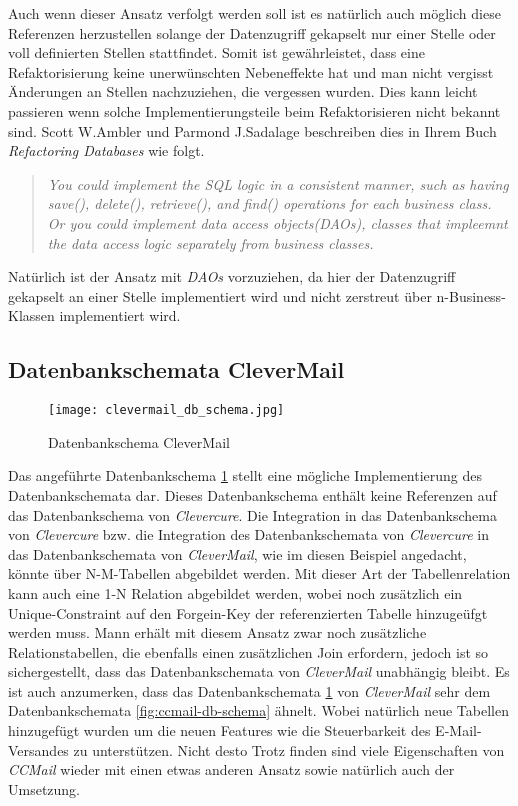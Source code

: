 \newline
\newline
Auch wenn dieser Ansatz verfolgt werden soll ist es natürlich auch möglich diese Referenzen herzustellen solange der Datenzugriff gekapselt nur einer Stelle oder voll definierten Stellen stattfindet. Somit ist gewährleistet, dass eine Refaktorisierung keine unerwünschten Nebeneffekte hat und man nicht vergisst Änderungen an Stellen nachzuziehen, die vergessen wurden. Dies kann leicht passieren wenn solche Implementierungsteile beim Refaktorisieren nicht bekannt sind. Scott W.Ambler und Parmond J.Sadalage beschreiben dies in Ihrem Buch 
\emph{Refactoring Databases} \cite[66]{refactoreDatabase} wie folgt.
\begin{quote}
\emph{You could implement the SQL logic in a consistent manner, such as having save(), delete(), retrieve(), and find() operations for each business class. Or you could implement data access objects(DAOs), classes that impleemnt the data access logic separately from business classes.}
\end{quote}
Natürlich ist der Ansatz mit \emph{DAOs} vorzuziehen, da hier der Datenzugriff gekapselt an einer Stelle implementiert wird und nicht zerstreut über n-Business-Klassen implementiert wird.
\newpage
\subsection{Datenbankschemata CleverMail}
\begin{figure}[h]
\centering
\texttt{[image: clevermail\_db\_schema.jpg]}
\caption{Datenbankschema CleverMail}
\label{fig:clevermail-db-schema}
\end{figure}
Das angeführte Datenbankschema \ref{fig:clevermail-db-schema} stellt eine mögliche Implementierung des Datenbankschemata dar. Dieses Datenbankschema enthält keine Referenzen auf das Datenbankschema von \emph{Clevercure}. Die Integration in das Datenbankschema von \emph{Clevercure} bzw. die Integration des Datenbankschemata von \emph{Clevercure} in das Datenbankschemata von \emph{CleverMail}, wie im diesen Beispiel angedacht, könnte über N-M-Tabellen abgebildet werden. Mit dieser Art der Tabellenrelation kann auch eine 1-N Relation abgebildet werden, wobei noch zusätzlich ein Unique-Constraint auf den Forgein-Key der referenzierten Tabelle hinzugeüfgt werden muss. Mann erhält mit diesem Ansatz zwar noch zusätzliche Relationstabellen, die ebenfalls einen zusätzlichen Join erfordern, jedoch ist so sichergestellt, dass das Datenbankschemata von \emph{CleverMail} unabhängig bleibt.
\newline
\newline
Es ist auch anzumerken, dass das Datenbankschemata \ref{fig:clevermail-db-schema} von \emph{CleverMail} sehr dem Datenbankschemata \ref{fig:ccmail-db-schema} ähnelt. Wobei natürlich neue Tabellen hinzugefügt wurden um die neuen Features wie die Steuerbarkeit des E-Mail-Versandes zu unterstützen. Nicht desto Trotz finden sind viele Eigenschaften von \emph{CCMail} wieder mit einen etwas anderen Ansatz sowie natürlich auch der Umsetzung.